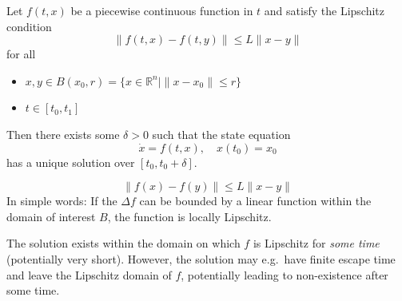Let $f (t, x)$ be a piecewise continuous function in $t$ and satisfy the Lipschitz condition
\noindent\begin{equation*}
    \|f (t, x)- f (t, y)\| \leq L \|x- y\|
\end{equation*}
for all
\begin{itemize}
    \item $x, y \in B (x_0, r) = \{x \in \mathbb{R}^n | \|x- x_0\| \leq r\}$
    \item $t \in [t_0, t_1]$
\end{itemize}
Then there exists some $\delta > 0$ such that the state equation
\noindent\begin{equation*}
    \dot{x} = f (t, x), \quad x (t_0) = x_0
\end{equation*}
has a unique solution over $[t_0, t_0 + \delta]$.

\newpar{}

\noindent\begin{equation*}
    \|f (x)- f (y)\| \leq L \|x- y\|
\end{equation*}
In simple words: If the $\Delta f$ can be bounded by a linear function within the domain of interest $B$, the function is locally Lipschitz.

\newpar{}

The solution exists within the domain on which $f$ is Lipschitz for \textit{some time} (potentially very short). However, the solution may e.g.\ have finite escape time and leave the Lipschitz domain of $f$, potentially leading to non-existence after some time.




